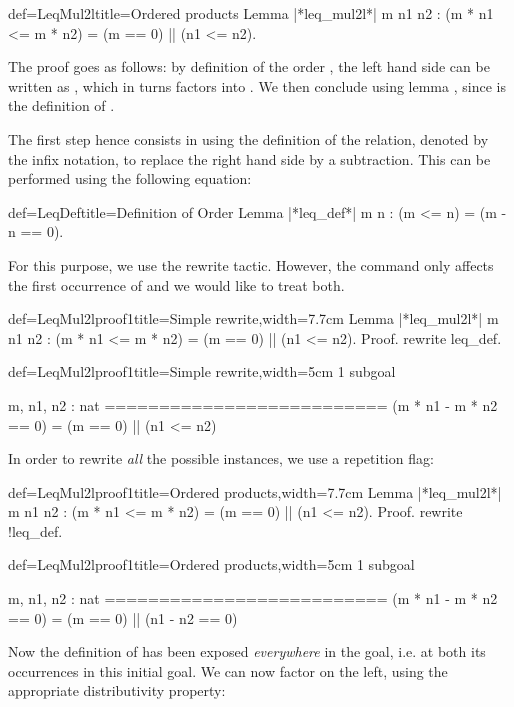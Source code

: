 \begin{coq}{def=LeqMul2l}{title=Ordered products}
Lemma |*leq_mul2l*| m n1 n2 : (m * n1 <= m * n2) = (m == 0) || (n1 <= n2).
\end{coq}

The proof goes as follows: by definition of the order \C{<=}, the left
hand side can be written as , which in turns
factors into . We then conclude using
lemma , since  is the definition of
.

The first step hence consists in using the definition of the
 relation, denoted by the \C{<=} infix notation, to replace the
right hand side by a subtraction. This can be performed using the
following equation:

\begin{coq}{def=LeqDef}{title=Definition of Order}
Lemma |*leq_def*| m n : (m <= n) = (m - n == 0).
\end{coq}
For this purpose, we use the rewrite tactic. However, the command
 only affects the first occurrence of \C{<=} and we
would like to treat both.

\begin{coq}{def=LeqMul2lproof1}{title=Simple rewrite,width=7.7cm}
Lemma |*leq_mul2l*| m n1 n2 :
(m * n1 <= m * n2) = (m == 0) || (n1 <= n2).
Proof.
rewrite leq_def.
\end{coq}
\begin{coqout}{def=LeqMul2lproof1}{title=Simple rewrite,width=5cm}
1 subgoal

m, n1, n2 : nat
==========================
(m * n1 - m * n2 == 0) =
(m == 0) || (n1 <= n2)
\end{coqout}

In order to rewrite \emph{all} the possible instances, we use a
repetition flag:

\begin{coq}{def=LeqMul2lproof1}{title=Ordered products,width=7.7cm}
Lemma |*leq_mul2l*| m n1 n2 :
(m * n1 <= m * n2) = (m == 0) || (n1 <= n2).
Proof.
rewrite !leq_def.
\end{coq}
\begin{coqout}{def=LeqMul2lproof1}{title=Ordered products,width=5cm}
1 subgoal

m, n1, n2 : nat
==========================
(m * n1 - m * n2 == 0) =
(m == 0) || (n1 - n2 == 0)
\end{coqout}

Now the definition of \C{<=} has been exposed
\emph{everywhere} in the goal, i.e. at both its occurrences in this
initial goal. We can now factor  on the left, using the appropriate
distributivity property:

